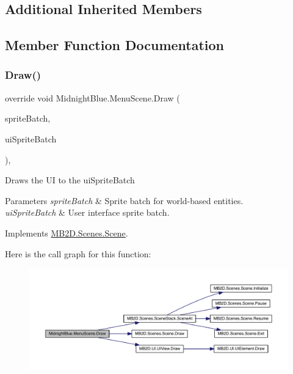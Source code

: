 \subsection*{Additional Inherited Members}


\subsection{Member Function Documentation}
\hypertarget{class_midnight_blue_1_1_menu_scene_a600112073f48c763a50c802960f5fdaa}{}\label{class_midnight_blue_1_1_menu_scene_a600112073f48c763a50c802960f5fdaa} 
\subsubsection{\texorpdfstring{Draw()}{Draw()}}
{\footnotesize\ttfamily override void Midnight\+Blue.\+Menu\+Scene.\+Draw (\begin{DoxyParamCaption}\item[{Sprite\+Batch}]{sprite\+Batch,  }\item[{Sprite\+Batch}]{ui\+Sprite\+Batch }\end{DoxyParamCaption})\hspace{0.3cm}{\ttfamily [inline]}, {\ttfamily [virtual]}}



Draws the UI to the ui\+Sprite\+Batch 


\begin{DoxyParams}{Parameters}
{\em sprite\+Batch} & Sprite batch for world-\/based entities.\\
\hline
{\em ui\+Sprite\+Batch} & User interface sprite batch.\\
\hline
\end{DoxyParams}


Implements \hyperlink{class_m_b2_d_1_1_scenes_1_1_scene_a932d33071ecb4c5187367825dba72324}{M\+B2\+D.\+Scenes.\+Scene}.

Here is the call graph for this function\+:
\nopagebreak
\begin{figure}[H]
\begin{center}
\leavevmode
\includegraphics[width=350pt]{class_midnight_blue_1_1_menu_scene_a600112073f48c763a50c802960f5fdaa_cgraph}
\end{center}
\end{figure}
\hypertarget{class_midnight_blue_1_1_menu_scene_acc60288dc2dff4d612b7a63615165de5}{}\label{class_midnight_blue_1_1_menu_scene_acc60288dc2dff4d612b7a63615165de5} 
